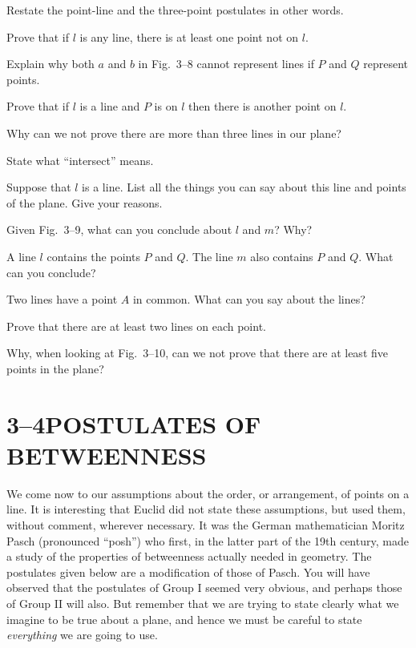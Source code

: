\documentclass[11pt]{book}
\theoremstyle{bkplain}
\theoremstyle{XIplainnote}
\theoremstyle{bkplain}
\theoremstyle{bkplain}
\begin{document}
\begin{exercisecols}
\begin{exlist}
\item Restate the point-line and the three-point postulates in other words.
\item Prove that if $l$ is any line, there is at least one point not on $l$.
\item Explain why both $a$ and $b$ in Fig.~3--8 cannot represent lines if $P$ and
      $Q$ represent points.
\exfig{\FIGIIIEIGHT}
\item Prove that if $l$ is a line and $P$ is on $l$ then there is another point
      on $l$.
\item Why can we not prove there are more than three lines in our plane?
\item State what ``intersect'' means.
\item Suppose that $l$ is a line. List all the things you can say about this line
      and points of the plane. Give your reasons.
\item Given Fig.~3--9, what can you conclude about $l$ and $m$? Why?
\exfig{\FIGIIININE}
\item A line $l$ contains the points $P$ and $Q$. The line $m$ also contains $P$
      and $Q$. What can you conclude?
\item Two lines have a point $A$ in common. What can you say about the lines?
\item Prove that there are at least two lines on each point.
\item Why, when looking at Fig.~3--10, can we not prove that there are at least
      five points in the plane?
\exfig{\FIGIIITEN}
\end{exlist}
\end{exercisecols}

\section*{3--4\quad POSTULATES OF BETWEENNESS}

We come now to our assumptions about the order, or arrangement, of points on a
line. It is interesting that Euclid did not state these assumptions, but used
them, without comment, wherever necessary. It was the German mathematician
Moritz Pasch (pronounced ``posh'') who first, in the latter part of the 19th
century, made a study of the properties of betweenness actually needed in
geometry. The postulates given below are a modification of those of Pasch. You
will have observed that the postulates of Group I seemed very obvious, and
perhaps those of Group II will also. But remember that we are trying to state
clearly what we imagine to be true about a plane, and hence we must be careful to
state \emph{everything} we are going to use.
\end{document}
